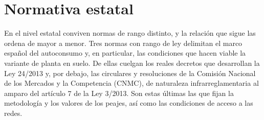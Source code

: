 \section{Normativa estatal}
\label{sec:norm-estatal}

En el nivel estatal conviven normas de rango distinto, y la relación que sigue las ordena de mayor a menor. Tres normas con rango de ley delimitan el marco español del autoconsumo y, en particular, las condiciones que hacen viable la variante de planta en suelo. De ellas cuelgan los reales decretos que desarrollan la Ley 24/2013 y, por debajo, las circulares y resoluciones de la Comisión Nacional de los Mercados y la Competencia (\ac{CNMC}), de naturaleza infrarreglamentaria al amparo del artículo 7 de la Ley 3/2013. Son estas últimas las que fijan la metodología y los valores de los peajes, así como las condiciones de acceso a las redes.

